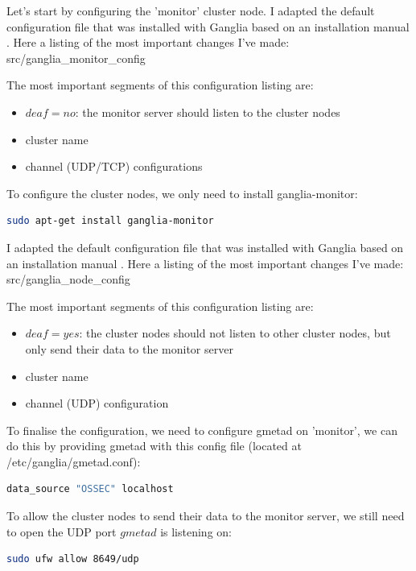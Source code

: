 \documentclass[12pt]{report}
\begin{document}
Let's start by configuring the 'monitor' cluster node. I adapted the
default configuration file that was installed with Ganglia based on an
 installation manual \cite{ganglia_install_manual}.
Here a listing of the most important changes I've made:
src/ganglia\_monitor\_config

The most important segments of this configuration listing are:
\begin{itemize}
\item $deaf = no$: the monitor server should listen to the cluster
  nodes
\item cluster name
\item channel (UDP/TCP) configurations
\end{itemize}

To configure the cluster nodes, we only need to install ganglia-monitor:
\begin{lstlisting}[language=bash]
sudo apt-get install ganglia-monitor
\end{lstlisting} 

I adapted the
default configuration file that was installed with Ganglia based on an
 installation manual \cite{ganglia_install_manual}.
Here a listing of the most important changes I've made:
src/ganglia\_node\_config

The most important segments of this configuration listing are:
\begin{itemize}
\item $deaf = yes$: the cluster nodes should not listen to other
  cluster nodes, but only send their data to the monitor server
\item cluster name
\item channel (UDP) configuration
\end{itemize}

To finalise the configuration, we need to configure gmetad on
'monitor', we can do this by providing gmetad with this config file
(located at /etc/ganglia/gmetad.conf):
\begin{lstlisting}[language=bash]
data_source "OSSEC" localhost
\end{lstlisting} 

To allow the cluster nodes to send their data to the monitor server,
we still need to open the UDP port $gmetad$ is listening on:
 \begin{lstlisting}[language=bash]
sudo ufw allow 8649/udp
\end{lstlisting} 
\end{document}
